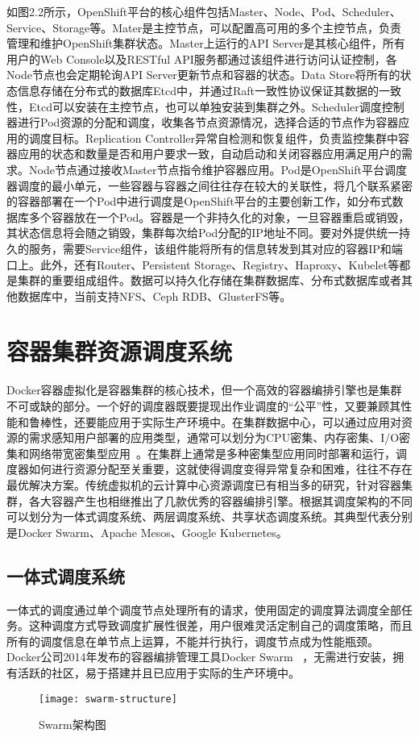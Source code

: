 如图2.2所示，OpenShift平台的核心组件包括Master、Node、Pod、Scheduler、Service、Storage等。Mater是主控节点，可以配置高可用的多个主控节点，负责管理和维护OpenShift集群状态。Master上运行的API Server是其核心组件，所有用户的Web Console以及RESTful API服务都通过该组件进行访问认证控制，各Node节点也会定期轮询API Server更新节点和容器的状态。Data Store将所有的状态信息存储在分布式的数据库Etcd中，并通过Raft一致性协议保证其数据的一致性，Etcd可以安装在主控节点，也可以单独安装到集群之外。Scheduler调度控制器进行Pod资源的分配和调度，收集各节点资源情况，选择合适的节点作为容器应用的调度目标。Replication Controller异常自检测和恢复组件，负责监控集群中容器应用的状态和数量是否和用户要求一致，自动启动和关闭容器应用满足用户的需求。Node节点通过接收Master节点指令维护容器应用。Pod是OpenShift平台调度器调度的最小单元，一些容器与容器之间往往存在较大的关联性，将几个联系紧密的容器部署在一个Pod中进行调度是OpenShift平台的主要创新工作，如分布式数据库多个容器放在一个Pod。容器是一个非持久化的对象，一旦容器重启或销毁，其状态信息将会随之销毁，集群每次给Pod分配的IP地址不同。要对外提供统一持久的服务，需要Service组件，该组件能将所有的信息转发到其对应的容器IP和端口上。此外，还有Router、Persistent Storage、Registry、Haproxy、Kubelet等都是集群的重要组成组件。数据可以持久化存储在集群数据库、分布式数据库或者其他数据库中，当前支持NFS、Ceph RDB、GlusterFS等。

\section{容器集群资源调度系统}
Docker容器虚拟化是容器集群的核心技术，但一个高效的容器编排引擎也是集群不可或缺的部分。一个好的调度器既要提现出作业调度的“公平”性，又要兼顾其性能和鲁棒性，还要能应用于实际生产环境中。在集群数据中心，可以通过应用对资源的需求感知用户部署的应用类型，通常可以划分为CPU密集、内存密集、I/O密集和网络带宽密集型应用~\cite{Peng2016Research,Shuangke2017SchedulingStrategy}。在集群上通常是多种密集型应用同时部署和运行，调度器如何进行资源分配至关重要，这就使得调度变得异常复杂和困难，往往不存在最优解决方案。传统虚拟机的云计算中心资源调度已有相当多的研究，针对容器集群，各大容器产生也相继推出了几款优秀的容器编排引擎。根据其调度架构的不同可以划分为一体式调度系统、两层调度系统、共享状态调度系统。其典型代表分别是Docker Swarm、Apache Mesos、Google Kubernetes。

\subsection{一体式调度系统}
一体式的调度通过单个调度节点处理所有的请求，使用固定的调度算法调度全部任务。这种调度方式导致调度扩展性很差，用户很难灵活定制自己的调度策略，而且所有的调度信息在单节点上运算，不能并行执行，调度节点成为性能瓶颈。Docker公司2014年发布的容器编排管理工具Docker Swarm~\cite{Jansen2016Employing,Naik2016Building} ，无需进行安装，拥有活跃的社区，易于搭建并且已应用于实际的生产环境中。
\begin{figure}[H] %
	\centering
	\texttt{[image: swarm-structure]}
	\caption{Swarm架构图}
\end{figure}

